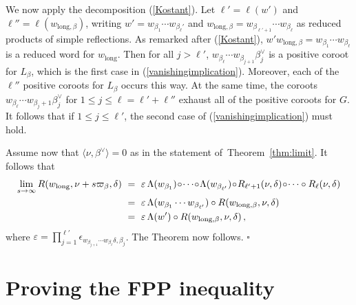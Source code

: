 \documentclass[12pt]{article}
\newcommand{\thmref}[1]{Theorem~\ref{#1}}
\numberwithin{equation}{section}
\renewcommand\b{\beta}
\renewcommand\d{\delta}
\newcommand\e{\varepsilon}
\renewcommand\({\left(}
\renewcommand\){\right)}
\newcommand{\bx}{\hfill$\square$\vspace{.6cm}}
\begin{document}
We now apply the decomposition (\ref{Kostant}).  Let $\ell'=\ell(w')$ and $\ell''=\ell(w_{\text{long},\beta})$,  writing $w'=w_{\beta_1}\cdots w_{\beta_\ell'}$ and $w_{\text{long},\beta}=w_{\beta_{\ell'+1}}\cdots w_{\beta_\ell}$ as reduced products of simple reflections.  As remarked after (\ref{Kostant}), $w'w_{\text{long},\beta}=w_{\beta_1}\cdots w_{\beta_\ell}$ is a reduced word for $w_{\text{long}}$.
 Then for all $j>\ell'$, $w_{\b_\ell}\cdots w_{\b_{j+1}}\beta_j^\vee$ is a positive coroot for $L_\beta$, which is the first case in (\ref{vanishingimplication}).  Moreover, each of the $\ell''$ positive coroots for $L_\beta$ occurs this way.  At the same time, the coroots $w_{\b_\ell}\cdots w_{\b_j+1}\b_j^\vee$ for $1\le j \le \ell=\ell'+\ell''$ exhaust all of the positive coroots for $G$.  It follows that if $1\le j \le \ell'$, the second case of (\ref{vanishingimplication}) must hold.


 Assume now that $\langle \nu,\beta^\vee\rangle =0$ as in the statement of~\thmref{thm:limit}.  It follows that
\begin{equation}\label{limitwithLambda}
\aligned
\lim_{s\rightarrow\infty} R(w_{\text{long}},\nu+s\varpi_\beta,\delta)  \ & = \  \e\,
\Lambda(w_{\beta_1}) \!\circ \!\cdots\! \circ \!\Lambda(w_{\beta_{\ell'}})\!\circ\!
R_{\ell'+1}(\nu,\d)\!\circ\! \cdots \circ R_{\ell}(\nu,\d) \\
& = \  \e\,\Lambda(w_{\beta_1}\cdots w_{\beta_{\ell'}})\circ R(w_{\text{long},\b},\nu,\d)\\
& =  \ \e\,\Lambda(w')\circ R(w_{\text{long},\b},\nu,\d)\,,
\endaligned
\end{equation}
where $\e=\prod_{j=1}^{\ell'} \epsilon_{w_{\beta_{j+1}}\cdots w_{\b_\ell}\d,\beta_j}$.
The Theorem now follows. \bx


\section{Proving the FPP inequality}\label{sec:FPPproof}
\end{document}
